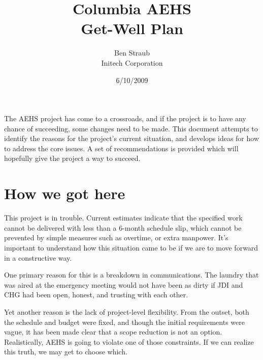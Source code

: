\documentclass[11pt]{article}
\begin{document}

\title{Columbia AEHS\\Get-Well Plan}
\author{Ben Straub\\Initech Corporation}
\date{6/10/2009}
\maketitle
\thispagestyle{empty}



\vskip 1in

 The AEHS project has come to a crossroads, and if the project is to have any chance of
succeeding, some changes need to be made.  This document attempts to identify the reasons for the
project's current situation, and develops ideas for how to address the core issues.  A set of
recommendations is provided which will hopefully give the project a way to succeed.

\clearpage

\tableofcontents \clearpage


\section{How we got here}

\todo[inline]{\ldots}

This project is in trouble.  Current estimates indicate that the specified work cannot be delivered
with less than a 6-month schedule slip, which cannot be prevented by simple measures such as
overtime, or extra manpower.  It's important to understand how this situation came to be if we are
to move forward in a constructive way.

One primary reason for this is a breakdown in communications.  The laundry that was aired at the
emergency meeting would not have been as dirty if JDI and CHG had been open, honest, and trusting
with each other.

Yet another reason is the lack of project-level flexibility.  From the outset, both the schedule and
budget were fixed, and though the initial requirements were vague, it has been made clear that a
scope reduction is not an option.  Realistically, AEHS is going to violate one of those constraints.
If we can realize this truth, we may get to choose which.  
\end{document}
